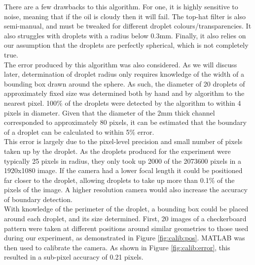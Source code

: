 \documentclass{physics_article_B}
\begin{document}
There are a few drawbacks to this algorithm. For one, it is highly sensitive to noise, meaning that if the oil is cloudy then it will fail. The top-hat filter is also semi-manual, and must be tweaked for different droplet colours/transparencies. It also struggles with droplets with a radius below 0.3mm. Finally, it also relies on our assumption that the droplets are perfectly spherical, which is not completely true.\\

The error produced by this algorithm was also considered. As we will discuss later, determination of droplet radius only requires knowledge of the width of a bounding box drawn around the sphere. As such, the diameter of 20 droplets of approximately fixed size was determined both by hand and by algorithm to the nearest pixel. 100\% of the droplets were detected by the algorithm to within 4 pixels in diameter. Given that the diameter of the 2mm thick channel corresponded to approximately 80 pixels, it can be estimated that the boundary of a droplet can be calculated to within 5\% error. \\

This error is largely due to the pixel-level precision and small number of pixels taken up by the droplet. As the droplets produced for the experiment were typically 25 pixels in radius, they only took up 2000 of the 2073600 pixels in a 1920x1080 image. If the camera had a lower focal length it could be positioned far closer to the droplet, allowing droplets to take up more than 0.1\% of the pixels of the image. A higher resolution camera would also increase the accuracy of boundary detection. \\

With knowledge of the perimeter of the droplet, a bounding box could be placed around each droplet, and its size determined. First, 20 images of a checkerboard pattern were taken at different positions around similar geometries to those used during our experiment, as demonstrated in Figure \ref{fig:calib:pos}. MATLAB\cite{CameraCalib} was then used to calibrate the camera. As shown in Figure \ref{fig:calib:error}, this resulted in a sub-pixel accuracy of 0.21 pixels. \\
\end{document}
